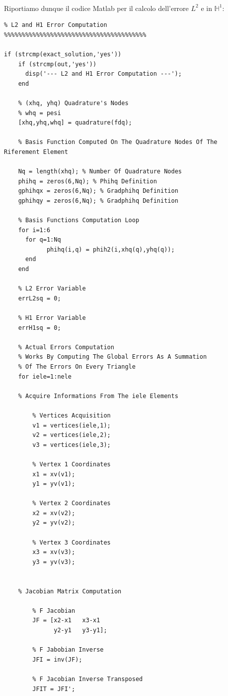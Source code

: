 \documentclass[12pt,a4paper]{report}
\theoremstyle{theorem}
\theoremstyle{theorem}
\theoremstyle{definition}
\begin{document}
\hfill \\
Riportiamo dunque il codice Matlab per il calcolo dell'errore $L^2$ e in $\mathbb{H}^{1}$:
\begin{lstlisting}[caption=Errore $L^2$ e $\mathbb{H}^1$, style=matlab]
%%%%%%%%%%%%%%%%%%%%%%%%%%%%%%%%%%%%%%%%
% L2 and H1 Error Computation
%%%%%%%%%%%%%%%%%%%%%%%%%%%%%%%%%%%%%%%%

if (strcmp(exact_solution,'yes'))
    if (strcmp(out,'yes'))
      disp('--- L2 and H1 Error Computation ---');
    end
    
    % (xhq, yhq) Quadrature's Nodes
    % whq = pesi
    [xhq,yhq,whq] = quadrature(fdq);

    % Basis Function Computed On The Quadrature Nodes Of The Riferement Element

    Nq = length(xhq); % Number Of Quadrature Nodes
    phihq = zeros(6,Nq); % Phihq Definition
    gphihqx = zeros(6,Nq); % Gradphihq Definition
    gphihqy = zeros(6,Nq); % Gradphihq Definition

    % Basis Functions Computation Loop
    for i=1:6
      for q=1:Nq
            phihq(i,q) = phih2(i,xhq(q),yhq(q));
      end
    end

    % L2 Error Variable
    errL2sq = 0;
    
    % H1 Error Variable
    errH1sq = 0;
    
    % Actual Errors Computation
    % Works By Computing The Global Errors As A Summation
    % Of The Errors On Every Triangle    
    for iele=1:nele
    
    % Acquire Informations From The iele Elements
    
        % Vertices Acquisition
        v1 = vertices(iele,1);
        v2 = vertices(iele,2);
        v3 = vertices(iele,3);
        
        % Vertex 1 Coordinates
        x1 = xv(v1);
        y1 = yv(v1);
    
        % Vertex 2 Coordinates
        x2 = xv(v2);
        y2 = yv(v2);
    
        % Vertex 3 Coordinates
        x3 = xv(v3);
        y3 = yv(v3);  
    
    
    % Jacobian Matrix Computation
 
        % F Jacobian
        JF = [x2-x1   x3-x1
              y2-y1   y3-y1]; 
           
        % F Jabobian Inverse
        JFI = inv(JF);
     
        % F Jacobian Inverse Transposed   
        JFIT = JFI';
        

\end{lstlisting}
\end{document}
